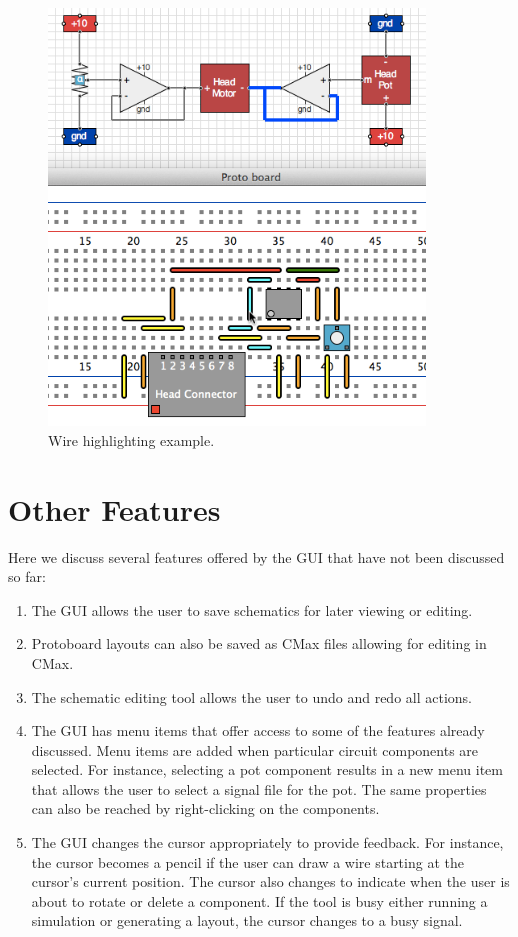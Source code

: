 \begin{figure}
\begin{center}
\includegraphics[width=10cm]{Images/gui_wire_highlight.png}
\caption[GUI wire highlighting example]{Wire highlighting example.}
\label{fig:wire_highlight}
\end{center}
\end{figure}

\section{Other Features}

Here we discuss several features offered by the GUI that have not been discussed
so far:

\begin{enumerate}
\item The GUI allows the user to save schematics for later viewing or editing.
\item Protoboard layouts can also be saved as CMax files allowing for editing
in CMax.
\item The schematic editing tool allows the user to undo and redo all actions.
\item The GUI has menu items that offer access to some of the features already
discussed. Menu items are added when particular circuit components are selected.
For instance, selecting a pot component results in a new menu item that allows
the user to select a signal file for the pot. The same properties can also be
reached by right-clicking on the components.
\item The GUI changes the cursor appropriately to provide feedback. For instance,
the cursor becomes
a pencil if the user can draw a wire starting at the cursor's current position.
The cursor also changes to indicate when the user is about to rotate or delete
a component. If the tool is busy either running a simulation or generating a
layout, the cursor changes to a busy signal.
\end{enumerate}

